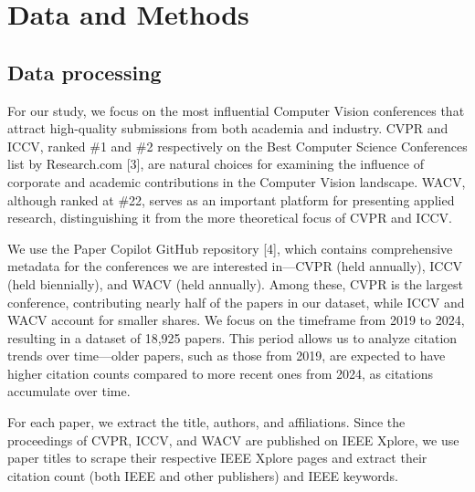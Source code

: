 \documentclass{article}
\begin{document}
\section{Data and Methods}
\vspace{-5pt}
\subsection{Data processing}
For our study, we focus on the most influential Computer Vision conferences that attract high-quality submissions from both academia and industry. CVPR and ICCV, ranked \#1 and \#2 respectively on the Best Computer Science Conferences list by Research.com [3], are natural choices for examining the influence of corporate and academic contributions in the Computer Vision landscape. WACV, although ranked at \#22, serves as an important platform for presenting applied research, distinguishing it from the more theoretical focus of CVPR and ICCV. 

We use the Paper Copilot GitHub repository [4], which contains comprehensive metadata for the conferences we are interested in—CVPR (held annually), ICCV (held biennially), and WACV (held annually). Among these, CVPR is the largest conference, contributing nearly half of the papers in our dataset, while ICCV and WACV account for smaller shares. We focus on the timeframe from 2019 to 2024, resulting in a dataset of 18,925 papers. This period allows us to analyze citation trends over time—older papers, such as those from 2019, are expected to have higher citation counts compared to more recent ones from 2024, as citations accumulate over time.

For each paper, we extract the title, authors, and affiliations. Since the proceedings of CVPR, ICCV, and WACV are published on IEEE Xplore, we use paper titles to scrape their respective IEEE Xplore pages and extract their citation count (both IEEE and other publishers) and IEEE keywords.
\end{document}
